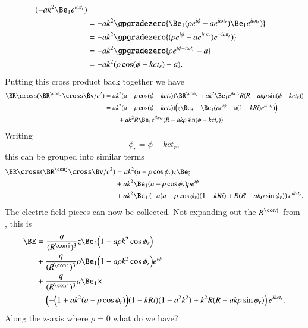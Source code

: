 {\begin{equation}
\begin{aligned}
(-a k^2 \Be_1 e^{i \omega t_r} )  \\
&=
- a k^2 \gpgradezero{
\Be_1 (\rho e^{i \phi} - a e^{i \omega t_r} )
\Be_1 e^{i \omega t_r} )
} \\
&=
- a k^2 \gpgradezero{
(\rho e^{i \phi} - a e^{i \omega t_r} )
e^{-i \omega t_r} )
} \\
&=
- a k^2 \gpgradezero{
\rho e^{i \phi - i \omega t_r} - a
} \\
&=
- a k^2 ( \rho \cos(\phi - k c t_r) - a ).
\end{aligned}
\end{equation}
%
Putting this cross product back together we have
%
\begin{equation}\label{eqn:relativisticElectrodynamicsExamReflection:1150}
\begin{aligned}
\BR \cross (\BR^\conj \cross \dot{\Bv}/c^2)
&=
a k^2 ( a -\rho \cos(\phi - k c t_r) ) \BR^\conj
+a k^2 \Be_1 e^{i k c  t_r} R(R - a k \rho \sin(\phi - k c t_r)) \\
&=
a k^2 ( a -\rho \cos(\phi - k c t_r) ) \Bigl(
z \Be_3 + \Be_1 (\rho e^{i \phi} - a (1 - k R i) e^{i k c t_r} )
\Bigr) \\
&\qquad +a k^2 R \Be_1 e^{i k c  t_r} (R - a k \rho \sin(\phi - k c t_r)).
\end{aligned}
\end{equation}
%
Writing
%
\begin{equation}\label{eqn:relativisticElectrodynamicsExamReflection:640}
\phi_r = \phi - k c t_r,
\end{equation}
%
this can be grouped into similar terms
%
\begin{equation}\label{eqn:relativisticElectrodynamicsExamReflection:660}
\begin{aligned}
\BR \cross (\BR^\conj \cross \dot{\Bv}/c^2)
&=
a k^2
(a - \rho \cos\phi_r) z \Be_3 \\
&+
a k^2
\Be_1
(a - \rho \cos\phi_r) \rho e^{i\phi} \\
&+
a k^2
\Be_1
\left(
-a (a - \rho \cos\phi_r) (1 - k R i)
+ R(R - a k \rho \sin \phi_r)
\right) e^{i k c t_r}.
\end{aligned}
\end{equation}
%
The electric field pieces can now be collected.  Not expanding out the \(R^\conj\) from , this is
%
\begin{equation}\label{eqn:relativisticElectrodynamicsExamReflection:700}
\begin{aligned}
\BE &=
\frac{q}{(R^\conj)^3} z \Be_3
\Bigl( 1 - a \rho k^2 \cos\phi_r \Bigr) \\
&+
\frac{q}{(R^\conj)^3} \rho
\Be_1 \Bigl(1 - a \rho k^2 \cos\phi_r \Bigr) e^{i\phi} \\
&+
\frac{q}{(R^\conj)^3} a \Be_1 \times \\
&\quad\left(
-\Bigl( 1 + a k^2 (a - \rho \cos\phi_r) \Bigr) (1 - k R i)(1 - a^2 k^2)
+ k^2 R(R - a k \rho \sin \phi_r)
\right) e^{i k c t_r}.
\end{aligned}
\end{equation}
%
Along the z-axis where \(\rho = 0\) what do we have?

}
